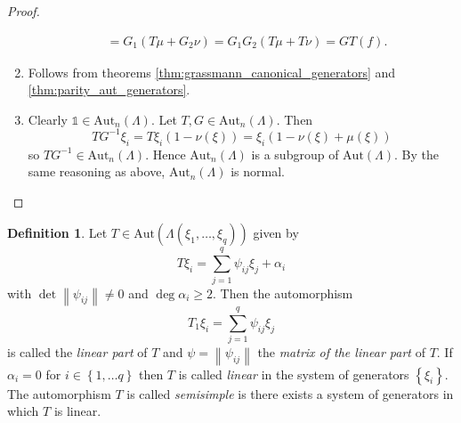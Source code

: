 \documentclass{article}
\theoremstyle{definition}
\newtheorem{definition}{Definition}
\begin{document}
\begin{proof}
\begin{enumerate}
\begin{align*}
            &= G_1 (T \mu + G_2 \nu) = G_1 G_2 (T\mu + T \nu) = G T (f).
        \end{align*}
        \item Follows from theorems \ref{thm:grassmann_canonical_generators} and \ref{thm:parity_aut_generators}.
        \item Clearly $\mathds{1} \in \text{Aut}_n(\Lambda)$. Let $T, G \in \text{Aut}_n(\Lambda)$. Then
        \begin{equation*}
            T G^{-1} \xi_i = T \xi_i (1 - \nu(\xi)) = \xi_i (1 - \nu(\xi) + \mu(\xi))
        \end{equation*}
        so $TG^{-1} \in \text{Aut}_n(\Lambda)$. Hence $\text{Aut}_n(\Lambda)$ is a subgroup of $\text{Aut}(\Lambda)$. By the same reasoning as above, $\text{Aut}_n(\Lambda)$ is normal.
    \end{enumerate}
\end{proof}

\begin{definition}
    Let $T \in \text{Aut}(\Lambda(\xi_1, \dots, \xi_q))$ given by
    \begin{equation*}
        T \xi_i = \sum_{j = 1}^q \psi_{ij} \xi_j + \alpha_i
    \end{equation*}
    with $\det \left\| \psi_{ij} \right\| \neq 0$ and $\deg \alpha_i \geq 2$. Then the automorphism
    \begin{equation*}
        T_1 \xi_i = \sum_{j = 1}^q \psi_{ij} \xi_j
    \end{equation*}
    is called the \emph{linear part} of $T$ and $\psi = \left\| \psi_{ij} \right\|$ the \emph{matrix of the linear part} of $T$. If $\alpha_i = 0$ for $i \in \left\{ 1, \dots q \right\}$ then $T$ is called \emph{linear} in the system of generators $\left\{ \xi_i \right\}$. The automorphism $T$ is called \emph{semisimple} is there exists a system of generators in which $T$ is linear. 
\end{definition}
\end{document}
